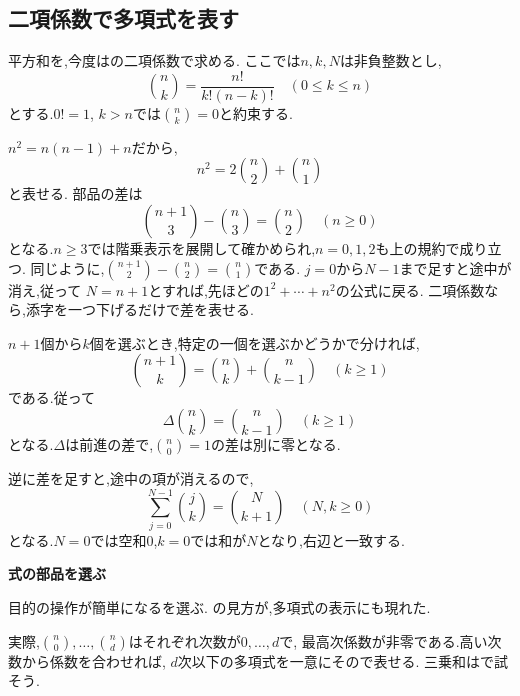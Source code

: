 \subsection{二項係数で多項式を表す}\label{節：二項係数で多項式を表す}
平方和を,今度はの二項係数で求める.
ここでは$n,k,N$は非負整数とし,
\[
  \binom nk=\frac{n!}{k!(n-k)!}\quad(0\le k\le n)
\]
とする.$0!=1$, $k>n$では$\binom nk=0$と約束する.

$n^2=n(n-1)+n$だから,
\[
  n^2=2\binom n2+\binom n1
\]
と表せる.
部品の差は
\[
  \binom{n+1}{3}-\binom n3=\binom n2\quad(n\ge0)
\]
となる.$n\ge3$では階乗表示を展開して確かめられ,$n=0,1,2$も上の規約で成り立つ.
同じように,$\binom{n+1}{2}-\binom n2=\binom n1$である.
$j=0$から$N-1$まで足すと途中が消え,従って
\BookMathLayout{\[
    \sum_{j=0}^{N-1}j^2=2\binom N3+\binom N2
    =\frac{N(N-1)(2N-1)}6.
  \]}{\[
    \begin{aligned}
      \sum_{j=0}^{N-1}j^2&=2\binom N3+\binom N2\\
      &=\frac{N(N-1)(2N-1)}6.
    \end{aligned}
  \]}
$N=n+1$とすれば,先ほどの$1^2+\cdots+n^2$の公式に戻る.
二項係数なら,添字を一つ下げるだけで差を表せる.

$n+1$個から$k$個を選ぶとき,特定の一個を選ぶかどうかで分ければ,
\[
  \binom{n+1}{k}=\binom nk+\binom n{k-1}\quad(k\ge1)
\]
である.従って
\[
  \Delta\binom nk=\binom n{k-1}\quad(k\ge1)
\]
となる.$\Delta$は前進の差で,$\binom n0=1$の差は別に零となる.

逆に差を足すと,途中の項が消えるので,
\[
  \sum_{j=0}^{N-1}\binom jk=\binom N{k+1}
  \quad(N,k\ge0)
\]
となる.$N=0$では空和$0$,$k=0$では和が$N$となり,右辺と一致する.
\BookFigBinomialDifference

\begin{bookpoint}
  \textbf{式の部品を選ぶ}\par
  目的の操作が簡単になるを選ぶ.
  の見方が,多項式の表示にも現れた.
\end{bookpoint}
実際,$\binom n0,\ldots,\binom nd$はそれぞれ次数が$0,\ldots,d$で,
最高次係数が非零である.高い次数から係数を合わせれば,
$d$次以下の多項式を一意にそので表せる.
三乗和はで試そう.
